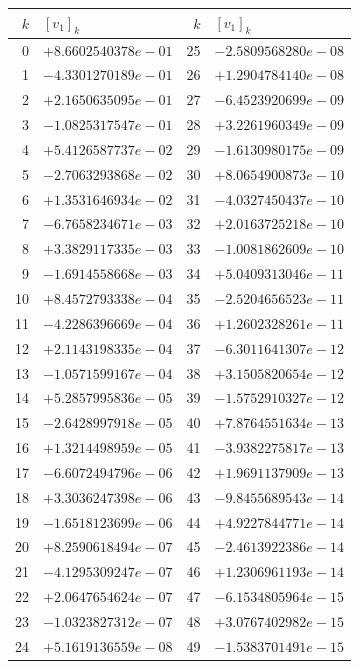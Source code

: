 \documentclass[11pt]{article}
\begin{document}
\begin{center}
{\footnotesize
\begin{tabular}{r@{\;\;}l@{\quad}r@{\;\;}l}
\toprule
$k$ & $[v_{1}]_k$ & $k$ & $[v_{1}]_k$ \\
\midrule
0 & $+8.6602540378e-01$ & 25 & $-2.5809568280e-08$ \\
1 & $-4.3301270189e-01$ & 26 & $+1.2904784140e-08$ \\
2 & $+2.1650635095e-01$ & 27 & $-6.4523920699e-09$ \\
3 & $-1.0825317547e-01$ & 28 & $+3.2261960349e-09$ \\
4 & $+5.4126587737e-02$ & 29 & $-1.6130980175e-09$ \\
5 & $-2.7063293868e-02$ & 30 & $+8.0654900873e-10$ \\
6 & $+1.3531646934e-02$ & 31 & $-4.0327450437e-10$ \\
7 & $-6.7658234671e-03$ & 32 & $+2.0163725218e-10$ \\
8 & $+3.3829117335e-03$ & 33 & $-1.0081862609e-10$ \\
9 & $-1.6914558668e-03$ & 34 & $+5.0409313046e-11$ \\
10 & $+8.4572793338e-04$ & 35 & $-2.5204656523e-11$ \\
11 & $-4.2286396669e-04$ & 36 & $+1.2602328261e-11$ \\
12 & $+2.1143198335e-04$ & 37 & $-6.3011641307e-12$ \\
13 & $-1.0571599167e-04$ & 38 & $+3.1505820654e-12$ \\
14 & $+5.2857995836e-05$ & 39 & $-1.5752910327e-12$ \\
15 & $-2.6428997918e-05$ & 40 & $+7.8764551634e-13$ \\
16 & $+1.3214498959e-05$ & 41 & $-3.9382275817e-13$ \\
17 & $-6.6072494796e-06$ & 42 & $+1.9691137909e-13$ \\
18 & $+3.3036247398e-06$ & 43 & $-9.8455689543e-14$ \\
19 & $-1.6518123699e-06$ & 44 & $+4.9227844771e-14$ \\
20 & $+8.2590618494e-07$ & 45 & $-2.4613922386e-14$ \\
21 & $-4.1295309247e-07$ & 46 & $+1.2306961193e-14$ \\
22 & $+2.0647654624e-07$ & 47 & $-6.1534805964e-15$ \\
23 & $-1.0323827312e-07$ & 48 & $+3.0767402982e-15$ \\
24 & $+5.1619136559e-08$ & 49 & $-1.5383701491e-15$ \\
\bottomrule
\end{tabular}
}
\end{center}
\end{document}
